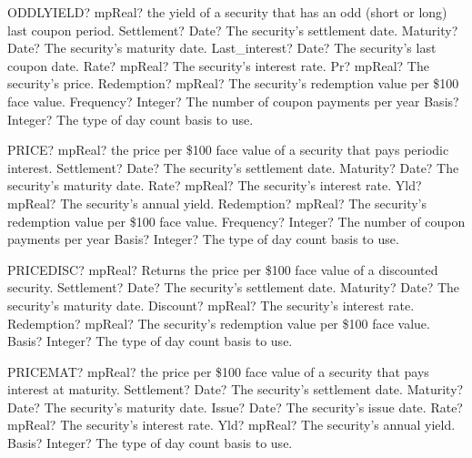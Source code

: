 \documentclass[12pt,a4paper,openany]{book}
\begin{document}
\begin{mpFunctionsExtract}
\mpWorksheetFunctionEightNotImplemented
{ODDLYIELD? mpReal? the yield of a security that has an odd (short or long) last coupon period.}
{Settlement? Date?  The security's settlement date.}
{Maturity? Date? The security's maturity date.}
{Last\_interest? Date? The security's last coupon date.}
{Rate? mpReal? The security's interest rate.}
{Pr? mpReal? The security's price.}
{Redemption? mpReal? The security's redemption value per \$100 face value.}
{Frequency? Integer? The number of coupon payments per year}
{Basis? Integer? The type of day count basis to use.}
\end{mpFunctionsExtract}

\begin{mpFunctionsExtract}
\mpWorksheetFunctionSevenNotImplemented
{PRICE? mpReal? the price per \$100 face value of a security that pays periodic interest.}
{Settlement? Date?  The security's settlement date.}
{Maturity? Date? The security's maturity date.}
{Rate? mpReal? The security's interest rate.}
{Yld? mpReal? The security's annual yield.}
{Redemption? mpReal? The security's redemption value per \$100 face value.}
{Frequency? Integer? The number of coupon payments per year}
{Basis? Integer? The type of day count basis to use.}
\end{mpFunctionsExtract}

\begin{mpFunctionsExtract}
\mpWorksheetFunctionFiveNotImplemented
{PRICEDISC? mpReal? Returns the price per \$100 face value of a discounted security.}
{Settlement? Date?  The security's settlement date.}
{Maturity? Date? The security's maturity date.}
{Discount? mpReal? The security's interest rate.}
{Redemption? mpReal? The security's redemption value per \$100 face value.}
{Basis? Integer? The type of day count basis to use.}
\end{mpFunctionsExtract}

\begin{mpFunctionsExtract}
\mpWorksheetFunctionSixNotImplemented
{PRICEMAT? mpReal? the price per \$100 face value  of a security that pays interest at maturity.}
{Settlement? Date?  The security's settlement date.}
{Maturity? Date? The security's maturity date.}
{Issue? Date? The security's issue date.}
{Rate? mpReal? The security's interest rate.}
{Yld? mpReal? The security's annual yield.}
{Basis? Integer? The type of day count basis to use.}
\end{mpFunctionsExtract}
\end{document}
